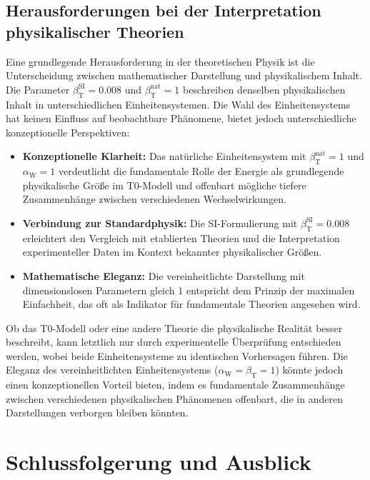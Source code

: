 \documentclass[12pt,a4paper]{article}
\newcommand{\betaT}{\beta_{\text{T}}}
\newcommand{\alphaW}{\alpha_{\text{W}}}
\begin{document}
	\subsection{Herausforderungen bei der Interpretation physikalischer Theorien}
	
	Eine grundlegende Herausforderung in der theoretischen Physik ist die Unterscheidung zwischen mathematischer Darstellung und physikalischem Inhalt. Die Parameter \(\betaT^{\text{SI}} = 0.008\) und \(\betaT^{\text{nat}} = 1\) beschreiben denselben physikalischen Inhalt in unterschiedlichen Einheitensystemen. Die Wahl des Einheitensystems hat keinen Einfluss auf beobachtbare Phänomene, bietet jedoch unterschiedliche konzeptionelle Perspektiven:
	
	\begin{itemize}
		\item \textbf{Konzeptionelle Klarheit:} Das natürliche Einheitensystem mit \(\betaT^{\text{nat}} = 1\) und \(\alphaW = 1\) verdeutlicht die fundamentale Rolle der Energie als grundlegende physikalische Größe im T0-Modell und offenbart mögliche tiefere Zusammenhänge zwischen verschiedenen Wechselwirkungen.
		\item \textbf{Verbindung zur Standardphysik:} Die SI-Formulierung mit \(\betaT^{\text{SI}} = 0.008\) erleichtert den Vergleich mit etablierten Theorien und die Interpretation experimenteller Daten im Kontext bekannter physikalischer Größen.
		\item \textbf{Mathematische Eleganz:} Die vereinheitlichte Darstellung mit dimensionslosen Parametern gleich 1 entspricht dem Prinzip der maximalen Einfachheit, das oft als Indikator für fundamentale Theorien angesehen wird.
	\end{itemize}
	
	Ob das T0-Modell oder eine andere Theorie die physikalische Realität besser beschreibt, kann letztlich nur durch experimentelle Überprüfung entschieden werden, wobei beide Einheitensysteme zu identischen Vorhersagen führen. Die Eleganz des vereinheitlichten Einheitensystems (\(\alphaW = \betaT = 1\)) könnte jedoch einen konzeptionellen Vorteil bieten, indem es fundamentale Zusammenhänge zwischen verschiedenen physikalischen Phänomenen offenbart, die in anderen Darstellungen verborgen bleiben könnten.
	
	\section{Schlussfolgerung und Ausblick}
	
\end{document}
